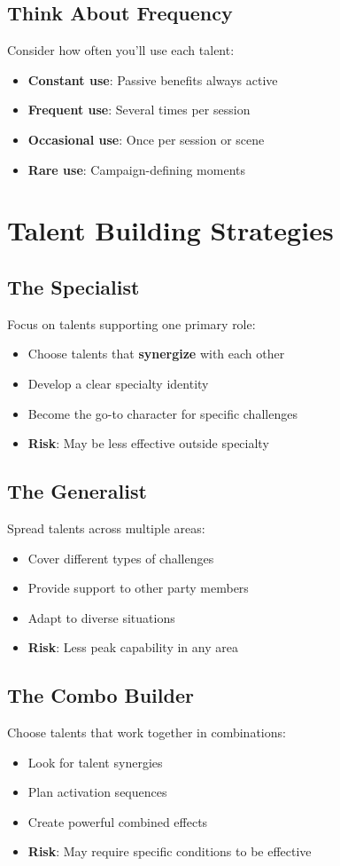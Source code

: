 \subsection*{Think About Frequency}
Consider how often you'll use each talent:
\begin{itemize}
\item \textbf{Constant use}: Passive benefits always active
\item \textbf{Frequent use}: Several times per session
\item \textbf{Occasional use}: Once per session or scene
\item \textbf{Rare use}: Campaign-defining moments
\end{itemize}

\section{Talent Building Strategies}

\subsection*{The Specialist}
Focus on talents supporting one primary role:
\begin{itemize}
\item Choose talents that \textbf{synergize} with each other
\item Develop a clear specialty identity
\item Become the go-to character for specific challenges
\item \textbf{Risk}: May be less effective outside specialty
\end{itemize}

\subsection*{The Generalist}
Spread talents across multiple areas:
\begin{itemize}
\item Cover different types of challenges
\item Provide support to other party members
\item Adapt to diverse situations
\item \textbf{Risk}: Less peak capability in any area
\end{itemize}

\subsection*{The Combo Builder}
Choose talents that work together in combinations:
\begin{itemize}
\item Look for talent synergies
\item Plan activation sequences
\item Create powerful combined effects
\item \textbf{Risk}: May require specific conditions to be effective
\end{itemize}

